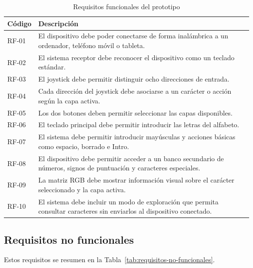 \begin{table}[H]
    \centering
    \caption{Requisitos funcionales del prototipo}
    \label{tab:requisitos-funcionales}
    \begin{tabularx}{\textwidth}{@{}p{}X@{}}
        \toprule
        \textbf{Código} & \textbf{Descripción} \\
        \midrule
        RF-01 & El dispositivo debe poder conectarse de forma inalámbrica a un ordenador, teléfono móvil o tableta. \\
        RF-02 & El sistema receptor debe reconocer el dispositivo como un teclado estándar. \\
        RF-03 & El joystick debe permitir distinguir ocho direcciones de entrada. \\
        RF-04 & Cada dirección del joystick debe asociarse a un carácter o acción según la capa activa. \\
        RF-05 & Los dos botones deben permitir seleccionar las capas disponibles. \\
        RF-06 & El teclado principal debe permitir introducir las letras del alfabeto. \\
        RF-07 & El sistema debe permitir introducir mayúsculas y acciones básicas como espacio, borrado e Intro. \\
        RF-08 & El dispositivo debe permitir acceder a un banco secundario de números, signos de puntuación y caracteres especiales. \\
        RF-09 & La matriz RGB debe mostrar información visual sobre el carácter seleccionado y la capa activa. \\
        RF-10 & El sistema debe incluir un modo de exploración que permita consultar caracteres sin enviarlos al dispositivo conectado. \\
        \bottomrule
    \end{tabularx}
\end{table}
\clearpage
\subsection{Requisitos no funcionales}
\label{subsec:requisitos-no-funcionales-nuevo}

Estos requisitos se resumen en la Tabla~\ref{tab:requisitos-no-funcionales}.

